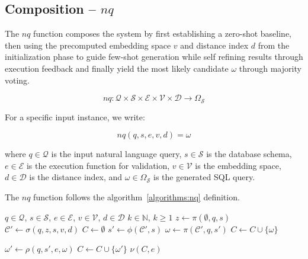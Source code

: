 \subsection{Composition – $nq$}

The $nq$ function composes the system by first establishing a
zero-shot baseline, then using the precomputed embedding space $v$ and distance
index $d$ from the initialization phase to guide few-shot generation while
self refining results through execution feedback and finally yield the most likely
candidate $\omega$ through majority voting.

$$
nq: \mathcal{Q} \times \mathcal{S} \times \mathcal{E} \times \mathcal{V} \times \mathcal{D} \rightarrow \Omega_{\mathcal{S}}
$$

\vspace{0.5em}

For a specific input instance, we write:

$$
nq(q, s, e, v, d) = \omega
$$

\vspace{0.5em}

where $q \in \mathcal{Q}$ is the input natural language query, $s \in \mathcal{S}$
is the database schema, $e \in \mathcal{E}$ is the execution function for validation,
$v \in \mathcal{V}$ is the embedding space, $d \in \mathcal{D}$ is the distance index,
and $\omega \in \Omega_{\mathcal{S}}$ is the generated SQL query.

The $nq$ function follows the algorithm~\ref{algorithms:nq} definition.

\begin{algorithm}
\caption{$nq$}\label{algorithms:nq}
\begin{algorithmic}[1]
\Require $q \in \mathcal{Q}$, $s \in \mathcal{S}$, $e \in \mathcal{E}$, $v \in \mathcal{V}$, $d \in \mathcal{D}$
\Require $k \in \mathbb{N}$, $k \geq 1$             
\State $z \gets \pi(\emptyset, q, s)$               
\State $\mathcal{C}' \gets \sigma(q, z, s, v, d)$   
\State $C \gets \emptyset$                          
                                   
    \State $s' \gets \phi(\mathcal{C}', s)$         
    \State $\omega \gets \pi(\mathcal{C}', q, s')$  
                                
        \State $C \gets C \cup \{\omega\}$          
    \EndIf

    \State $\omega' \gets \rho(q, s', e, \omega)$   
                               
        \State $C \gets C \cup \{\omega'\}$         
    \EndIf
\EndWhile
\State \Return $\nu(C, e)$                          
\end{algorithmic}
\end{algorithm}
